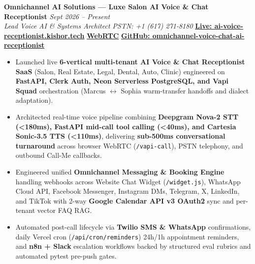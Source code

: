 \documentclass[9.5pt,a4paper]{article}
\begin{document}
\noindent\textbf{Omnichannel AI Solutions --- Luxe Salon AI Voice \& Chat Receptionist} \hfill {\small\textit{Sept 2026 -- Present}}\\
\textit{Lead Voice AI \& Systems Architect \;\textbar\; PSTN: +1 (617) 271-8180} \hfill {\footnotesize\href{https://ai-voice-receptionist.kishor.tech/}{\textbf{Live: ai-voice-receptionist.kishor.tech}} \;\textbar\; \href{https://ai-voice-receptionist.kishor.tech/vapi-call}{\textbf{WebRTC}} \;\textbar\; \href{https://github.com/KishorKumarParoi/omnichannel-voice-chat-ai-receptionist}{\textbf{GitHub: omnichannel-voice-chat-ai-receptionist}}}
\begin{itemize}
    \item Launched live \textbf{6-vertical multi-tenant AI Voice \& Chat Receptionist SaaS} (Salon, Real Estate, Legal, Dental, Auto, Clinic) engineered on \textbf{FastAPI, Clerk Auth, Neon Serverless PostgreSQL, and Vapi Squad} orchestration (Marcus $\leftrightarrow$ Sophia warm-transfer handoffs and dialect adaptation).
    \item Architected real-time voice pipeline combining \textbf{Deepgram Nova-2 STT (<180ms), FastAPI mid-call tool calling (<40ms), and Cartesia Sonic-3.5 TTS (<110ms)}, delivering \textbf{sub-500ms conversational turnaround} across browser WebRTC (\texttt{/vapi-call}), PSTN telephony, and outbound Call-Me callbacks.
    \item Engineered unified \textbf{Omnichannel Messaging \& Booking Engine} handling webhooks across Website Chat Widget (\texttt{/widget.js}), WhatsApp Cloud API, Facebook Messenger, Instagram DMs, Telegram, X, LinkedIn, and TikTok with 2-way \textbf{Google Calendar API v3 OAuth2} sync and per-tenant vector FAQ RAG.
    \item Automated post-call lifecycle via \textbf{Twilio SMS \& WhatsApp} confirmations, daily Vercel cron (\texttt{/api/cron/reminders}) 24h/1h appointment reminders, and \textbf{n8n + Slack} escalation workflows backed by structured eval rubrics and automated pytest pre-push gates.
\end{itemize}
\end{document}

